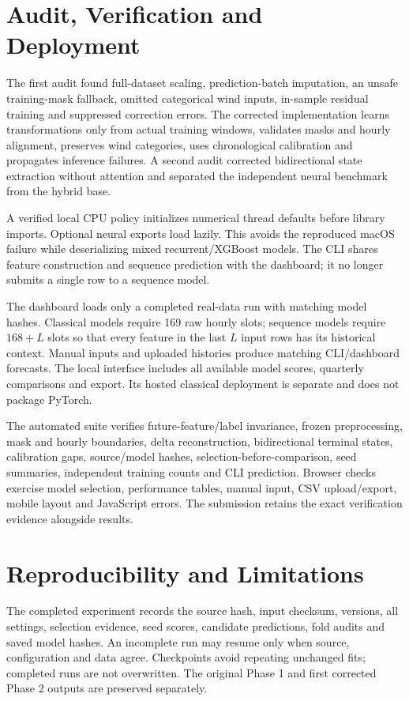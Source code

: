 \documentclass[conference]{IEEEtran}
\begin{document}
\section{Audit, Verification and Deployment}
The first audit found full-dataset scaling, prediction-batch imputation, an unsafe training-mask fallback, omitted categorical wind inputs, in-sample residual training and suppressed correction errors. The corrected implementation learns transformations only from actual training windows, validates masks and hourly alignment, preserves wind categories, uses chronological calibration and propagates inference failures. A second audit corrected bidirectional state extraction without attention and separated the independent neural benchmark from the hybrid base.

A verified local CPU policy initializes numerical thread defaults before library imports. Optional neural exports load lazily. This avoids the reproduced macOS failure while deserializing mixed recurrent/XGBoost models. The CLI shares feature construction and sequence prediction with the dashboard; it no longer submits a single row to a sequence model.

The dashboard loads only a completed real-data run with matching model hashes. Classical models require 169 raw hourly slots; sequence models require $168+L$ slots so that every feature in the last $L$ input rows has its historical context. Manual inputs and uploaded histories produce matching CLI/dashboard forecasts. The local interface includes all available model scores, quarterly comparisons and export. Its hosted classical deployment is separate and does not package PyTorch.

The automated suite verifies future-feature/label invariance, frozen preprocessing, mask and hourly boundaries, delta reconstruction, bidirectional terminal states, calibration gaps, source/model hashes, selection-before-comparison, seed summaries, independent training counts and CLI prediction. Browser checks exercise model selection, performance tables, manual input, CSV upload/export, mobile layout and JavaScript errors. The submission retains the exact verification evidence alongside results.

\section{Reproducibility and Limitations}
The completed experiment records the source hash, input checksum, versions, all settings, selection evidence, seed scores, candidate predictions, fold audits and saved model hashes. An incomplete run may resume only when source, configuration and data agree. Checkpoints avoid repeating unchanged fits; completed runs are not overwritten. The original Phase 1 and first corrected Phase 2 outputs are preserved separately.
\end{document}
